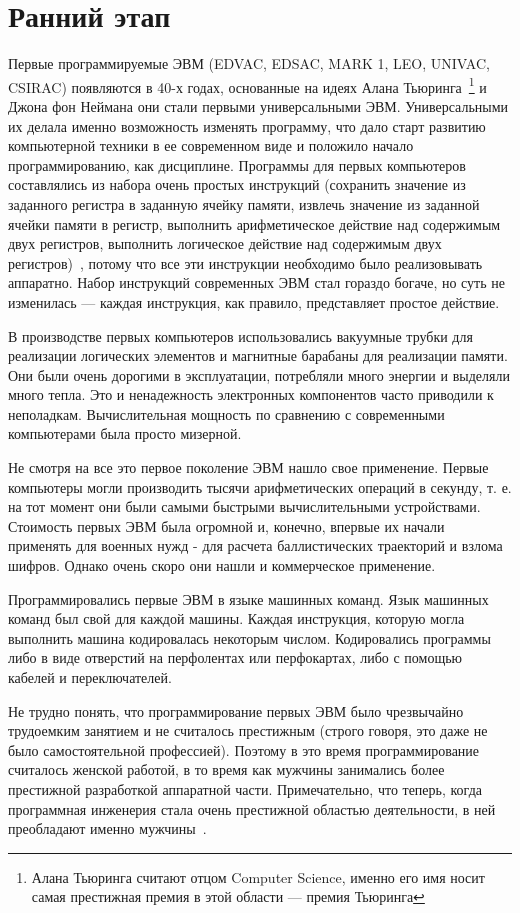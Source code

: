 \section{Ранний этап}

Первые программируемые ЭВМ (EDVAC, EDSAC, MARK 1, LEO, UNIVAC, CSIRAC) появляются в 40-х годах, основанные на идеях Алана Тьюринга~\footnote{Алана Тьюринга считают отцом Computer Science, именно его имя носит самая престижная премия в этой области — премия Тьюринга} и Джона фон Неймана они стали первыми универсальными ЭВМ. Универсальными их делала именно возможность изменять программу, что дало старт развитию компьютерной техники в ее современном виде и положило начало программированию, как дисциплине. Программы для первых компьютеров составлялись из набора очень простых инструкций (сохранить значение из заданного регистра в заданную ячейку памяти, извлечь значение из заданной ячейки памяти в регистр, выполнить арифметическое действие над содержимым двух регистров, выполнить логическое действие над содержимым двух регистров)~\cite{Turing}, потому что все эти инструкции необходимо было реализовывать аппаратно. Набор инструкций современных ЭВМ стал гораздо богаче, но суть не изменилась — каждая инструкция, как правило, представляет простое действие.

В производстве первых компьютеров использовались вакуумные трубки для реализации логических элементов и магнитные барабаны для реализации памяти. Они были очень дорогими в эксплуатации, потребляли много энергии и выделяли много тепла. Это и ненадежность электронных компонентов часто приводили к неполадкам. Вычислительная мощность по сравнению с современными компьютерами была просто мизерной.

Не смотря на все это первое поколение ЭВМ нашло свое применение. Первые компьютеры могли производить тысячи арифметических операций в секунду, т. е. на тот момент они были самыми быстрыми вычислительными устройствами. Стоимость первых ЭВМ была огромной и, конечно, впервые их начали применять для военных нужд - для расчета баллистических траекторий и взлома шифров. Однако очень скоро они нашли и коммерческое применение.

Программировались первые ЭВМ в языке машинных команд. Язык машинных команд был свой для каждой машины. Каждая инструкция, которую могла выполнить машина кодировалась некоторым числом. Кодировались программы либо в виде отверстий на перфолентах или перфокартах, либо с помощью кабелей и переключателей.

Не трудно понять, что программирование первых ЭВМ было чрезвычайно трудоемким занятием и не считалось престижным (строго говоря, это даже не было самостоятельной профессией). Поэтому в это время программирование считалось женской работой, в то время как мужчины занимались более престижной разработкой аппаратной части. Примечательно, что теперь, когда программная инженерия стала очень престижной областью деятельности, в ней преобладают именно мужчины~\cite{CSWOMEN}.

